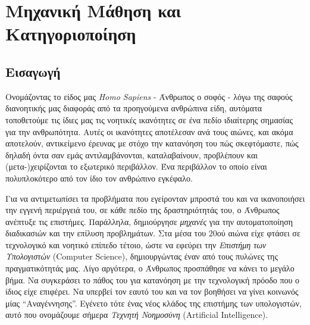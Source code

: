 \chapter{Μηχανική Μάθηση και Κατηγοριοποίηση}
\label{machineLearningAndClassification}
\section{Εισαγωγή}
Ονομάζοντας το είδος μας \emph{Homo Sapiens} - Άνθρωπος ο σοφός - λόγω της σαφούς διανοητικής μας διαφοράς από τα προηγούμενα ανθρώπινα είδη, αυτόματα τοποθετούμε τις ίδιες μας τις νοητικές ικανότητες σε ένα πεδίο ιδιαίτερης σημασίας για την ανθρωπότητα. Αυτές οι ικανότητες  αποτέλεσαν ανά τους αιώνες, και ακόμα αποτελούν, αντικείμενο έρευνας με στόχο την κατανόηση του πώς σκεφτόμαστε, πώς δηλαδή όντα σαν εμάς αντιλαμβάνονται, καταλαβαίνουν, προβλέπουν και (μετα-)χειρίζονται το εξωτερικό περιβάλλον. Ένα περιβάλλον το οποίο είναι πολυπλοκότερο από τον ίδιο τον ανθρώπινο εγκέφαλο. 

Για να αντιμετωπίσει τα προβλήματα που εγείρονταν μπροστά του και να ικανοποιήσει την εγγενή περιέργειά του, σε κάθε πεδίο της δραστηριότητάς του, ο Άνθρωπος ανέπτυξε τις επιστήμες. Παράλληλα, δημιούργησε \emph{μηχανές} για την αυτοματοποίηση διαδικασιών και την επίλυση προβλημάτων. Στα μέσα του $20$ού αιώνα είχε φτάσει σε τεχνολογικό και νοητικό επίπεδο τέτοιο, ώστε να εφεύρει την \emph{Επιστήμη των Υπολογιστών} (Computer Science), δημιουργώντας έναν από τους πυλώνες της πραγματικότητάς μας. Λίγο αργότερα, ο Άνθρωπος προσπάθησε να κάνει το μεγάλο βήμα. Να συγκεράσει το πάθος του για κατανόηση με την τεχνολογική πρόοδο που ο ίδιος είχε επιφέρει. Να υπερβεί τον εαυτό του και να τον βοηθήσει να γίνει κοινωνός μίας “Αναγέννησης”. Εγένετο τότε ένας νέος κλάδος της επιστήμης των υπολογιστών, αυτό που ονομάζουμε σήμερα \emph{Τεχνητή Νοημοσύνη} (Artificial Intelligence).

